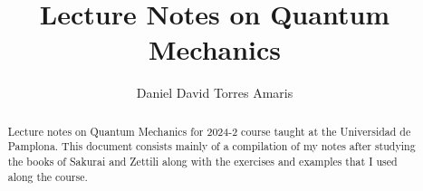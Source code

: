\documentclass{article}
\title{Lecture Notes on Quantum Mechanics}
\author{Daniel David Torres Amaris}
\begin{document}
\begin{titlepage}
\thispagestyle{empty}
\maketitle

\begin{abstract}
Lecture notes on Quantum Mechanics for 2024-2 course taught at the Universidad de Pamplona. This document consists mainly of a compilation of my notes after studying the books of Sakurai and Zettili along with the exercises and examples that I used along the course.
\end{abstract}

\tableofcontents
\end{titlepage}

\end{document}
